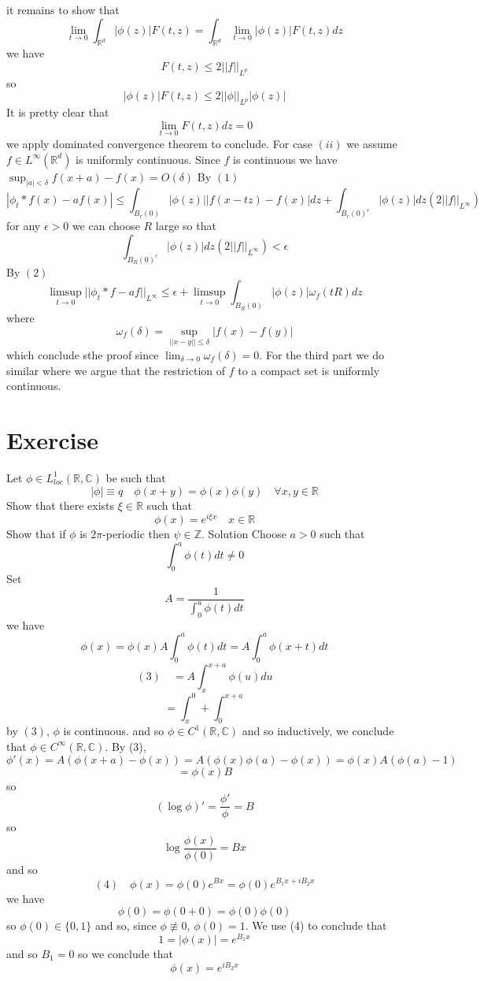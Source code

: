 \documentclass[11pt]{article}
\begin{document}
it remains to show that
\[
\lim_{t\to 0} \int_{ \mathbb{R}^{d}}^{}|\phi(z)|F(t,z) = \int_{ \mathbb{R}^{d}}^{}\lim_{t\to 0} |\phi(z)|F(t,z)dz
\] 
we have
\[
    F(t,z) \le 2 ||f||_{L^{p}}
\] 
so
\[
    |\phi(z)|F(t,z) \le 2 ||\phi||_{L^{p}} |\phi(z)|
\] 
It is pretty clear that 
\[
\lim_{t\to 0}F(t,z)dz = 0
\] 
we apply dominated convergence theorem to conclude.
For case $(ii)$ we assume  $f \in L^{\infty} ( \mathbb{R}^{d})$ is uniformly continuous.
Since $f$ is continuous we have  $\sup_{|a| < \delta}f(x+a) - f(x) = O(\delta)$ 
By $(1)$
\[
    |\phi_t * f(x) - af(x)| \le \int_{ B_r(0)}^{} |\phi(z)| |f(x-tz) - f(x)|dz + \int_{ B_r(0)^{c}}^{}|\phi(z)|dz (2 ||f||_{L^{\infty}})
\] 
for any $\epsilon > 0$ we can choose $ R$ large so that
 \[
     \int_{ B_R(0)^{c}}^{}|\phi(z)|dz (2 ||f||_{L^{\infty}}) < \epsilon
\] 
By $(2)$ 
 \[
     \limsup_{t\to 0} ||\phi_t * f - af||_{L^{\infty}} \le \epsilon + \limsup_{t\to 0}\int_{B_R(0)}^{}|\phi(z)| \omega_f(tR) dz
\] 
where
\[
    \omega_f(\delta) = \sup_{||x-y||\le \delta}|f(x) -f(y)|
\] 
which conclude sthe proof since $\lim_{\delta\to 0}\omega_f(\delta) = 0$.
For the third part we do similar where we argue that the restriction of $f$ to a compact set is uniformly continuous.

\section{Exercise}
Let  $\phi \in L^{1}_{loc}( \mathbb{R}, \mathbb{C})$ be such that
\[
|\phi| \equiv q \quad \phi(x+y) = \phi(x) \phi(y) \quad \forall x,y \in \mathbb{R}
\] 
Show that there exists $\xi \in  \mathbb{R}$ such that
\[
\phi(x) = e^{i \xi x} \quad x \in \mathbb{R}
\] 
Show that if $\phi$ is $2\pi$-periodic then $\psi \in \mathbb{Z}$.
Solution Choose $a > 0 $ such that
 \[
\int_{0}^{a}\phi(t)dt \ne 0
\] 
Set 
 \[
A = \frac{1}{\int_{0}^{a}\phi(t)dt}
\] 
we have
\[
\phi(x) = \phi(x) A \int_{0}^{a}\phi(t)dt = A \int_{0}^{a} \phi(x+t)dt
\] 
\[
    (3) \quad = A \int_{x}^{x+a}\phi(u)du
\] 
\[
= \int_{x}^{0} + \int_{0}^{x+a}
\] 
by $(3)$,  $\phi$ is continuous. and so $\phi \in C^{1}( \mathbb{R}, \mathbb{C})$  and so 
inductively, we conclude that $\phi \in C^{\infty} ( \mathbb{R}, \mathbb{C})$.
By (3),
\[
\phi'(x) = A (\phi(x+a) - \phi(x)) = A(\phi(x)\phi(a) - \phi(x)) = \phi(x) A(\phi(a) - 1)
\] 
\[
= \phi(x)B
\] 
so
\[
    (\log \phi)' = \frac{\phi'}{\phi} = B
\] 
so
\[
\log \frac{\phi(x)}{\phi(0)} = Bx
\] 
and so
\[
    (4) \quad \phi(x) = \phi(0)e^{Bx} = \phi(0) e^{B_1x + i B_2x}
\] 
we have
\[
\phi(0) = \phi(0+0) = \phi(0)\phi(0)
\] 
so $\phi(0) \in \{0,1\}$ and so, since $\phi \not\equiv 0 $, $\phi(0) = 1$.
We use (4) to conclude that
\[
1 = |\phi(x)| = e^{B_1x}
\] 
and so $B_1 = 0$ so we conclude that
\[
\phi(x) = e^{iB_2 x}
\] 
\end{document}
